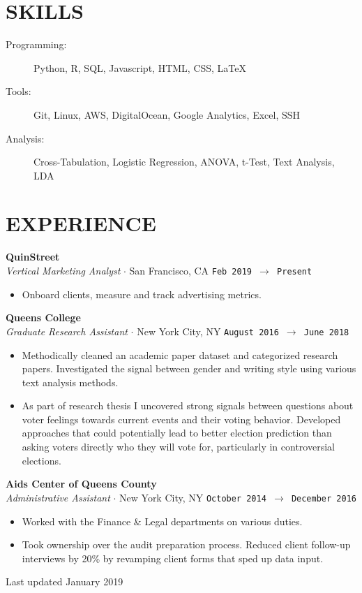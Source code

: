 \documentclass[margin, line, 11pt]{res}
\begin{document}
\begin{resume}
\section{SKILLS}

\begin{description}
\item[Programming:] Python, R, SQL, Javascript, HTML, CSS, \LaTeX
\item[Tools:] Git, Linux, AWS, DigitalOcean, Google Analytics, Excel, SSH
\item[Analysis:] Cross-Tabulation, Logistic Regression, ANOVA, t-Test, Text Analysis, LDA
\end{description}

\section{EXPERIENCE}

{\bf QuinStreet}\vspace{0.04in}
\\ {\it Vertical Marketing Analyst} $\cdot$ San Francisco, CA \hfill\texttt{Feb 2019 $\to$ Present}\vspace{0.04in}
\begin{itemize}
\item Onboard clients, measure and track advertising metrics.
\end{itemize}

{\bf Queens College}\vspace{0.04in}
\\ {\it Graduate Research Assistant} $\cdot$ New York City, NY \hfill\texttt{August 2016 $\to$ June 2018}\vspace{0.04in}
\begin{itemize}
\item Methodically cleaned an academic paper dataset and categorized research papers. Investigated the signal between gender and writing style using various text analysis methods. 
\item As part of research thesis I uncovered strong signals between questions about voter feelings towards current events and their voting behavior. Developed approaches that could potentially lead to better election prediction than asking voters directly who they will vote for, particularly in controversial elections.
\end{itemize}

{\bf Aids Center of Queens County}\vspace{0.04in}
\\ {\it Administrative Assistant} $\cdot$ New York City, NY \hfill\texttt{October 2014 $\to$ December 2016}\vspace{0.04in}
\begin{itemize}
\item Worked with the Finance \& Legal departments on various duties.
\item Took ownership over the audit preparation process. Reduced client follow-up interviews by 20\% by revamping client forms that sped up data input.
\end{itemize}

\end{resume}

\hfill{Last updated January 2019}
\end{document}
